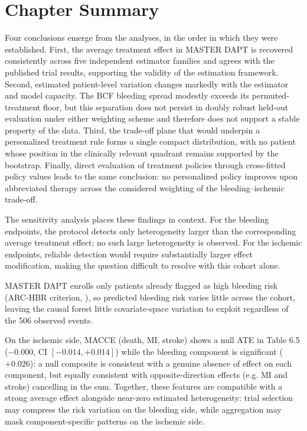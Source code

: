 \section{Chapter Summary}

Four conclusions emerge from the analyses, in the order in which they were
established. First, the average treatment effect in MASTER DAPT is recovered
consistently across five independent estimator families and agrees with the
published trial results, supporting the validity of the estimation framework.
Second, estimated patient-level variation changes markedly with the estimator
and model capacity. The BCF bleeding spread modestly exceeds its permuted-treatment
floor, but this separation does not persist in doubly robust held-out evaluation
under either weighting scheme and therefore does not support a stable property of
the data. Third, the trade-off plane that would underpin a
personalized treatment rule forms a single compact distribution, with no
patient whose position in the clinically relevant quadrant remains supported
by the bootstrap. Finally, direct evaluation of treatment policies through
cross-fitted policy values leads to the same conclusion: no personalized
policy improves upon abbreviated therapy across the considered weighting of
the bleeding--ischemic trade-off.

The sensitivity analysis places these findings in context. For the bleeding
endpoints, the protocol detects only heterogeneity larger than the corresponding
average treatment effect; no such large heterogeneity is observed. For
the ischemic endpoints, reliable detection would require substantially larger
effect modification, making the question difficult to resolve with this
cohort alone.

MASTER DAPT enrolls only patients already flagged as high bleeding risk
(ARC-HBR criterion, \citealp{valgimigli2021appendix}), so predicted bleeding risk varies little across the cohort,
leaving the causal forest little covariate-space variation to exploit
regardless of the 506 observed events.

On the ischemic side, MACCE (death, MI, stroke) shows a null ATE in Table 6.5
($-0.000$, CI $[-0.014,+0.014]$) while the bleeding component is significant
($+0.026$): a null composite is consistent with a genuine absence of effect on
each component, but equally consistent with opposite-direction effects (e.g. MI and stroke)
cancelling in the sum. Together, these features are compatible with a strong
average effect alongside near-zero estimated heterogeneity: trial selection may
compress the risk variation on the bleeding side, while aggregation may mask
component-specific patterns on the ischemic side.
